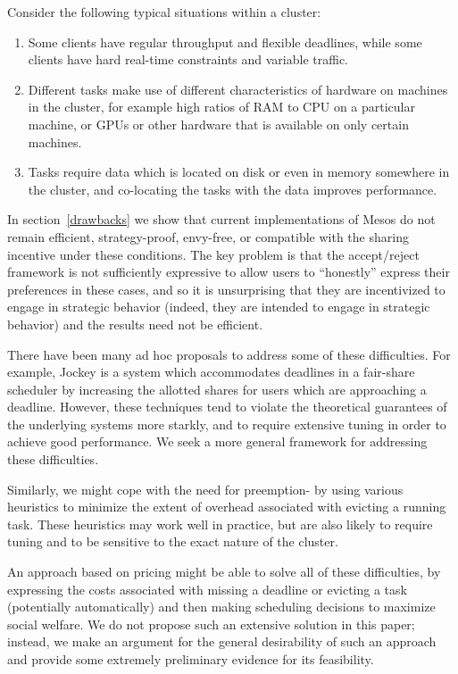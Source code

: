 \documentclass{acm_proc_article-sp}
\begin{document}
Consider the following typical situations within a cluster:
\vspace{-5mm}
\begin{enumerate}
\itemsep0em
  \item Some clients have regular throughput and flexible deadlines, while some
    clients have hard real-time constraints and variable traffic.
  \item Different tasks make use of different characteristics of hardware on
    machines in the cluster, for example high ratios of RAM to CPU on a
    particular machine, or GPUs or other hardware that is available on only
    certain machines.
  \item Tasks require data which is located on disk or even in memory somewhere
    in the cluster, and co-locating the tasks with the data improves
    performance.
\end{enumerate}
\vspace{-5mm}
In section~\ref{drawbacks} we show that current implementations
of Mesos do not remain efficient, strategy-proof, envy-free,
or compatible with the sharing incentive under these conditions.
The key problem is that the accept/reject framework is not sufficiently expressive
to allow users to ``honestly'' express their preferences in these cases,
and so it is unsurprising that they are incentivized to engage
in strategic behavior (indeed, they are intended to engage in strategic behavior)
and the results need not be efficient.

There have been many ad hoc proposals to address some of these difficulties.
For example, Jockey is a system which accommodates deadlines in a fair-share
scheduler by increasing the allotted shares for users which are approaching
a deadline.
However, these techniques tend to violate the theoretical guarantees
of the underlying systems more starkly, and to require extensive tuning
in order to achieve good performance.
We seek a more general framework for addressing these difficulties.

Similarly, we might cope with the need for preemption-  by using various
heuristics to minimize the extent of overhead associated with evicting a running
task.
These heuristics may work well in practice, but are also likely to require
tuning and to be sensitive to the exact nature of the cluster.

An approach based on pricing might be able to solve all of these difficulties,
by expressing the costs associated with missing a deadline or evicting a task 
(potentially automatically) and then making scheduling decisions to maximize
social welfare.
We do not propose such an extensive solution in this paper; instead,
we make an argument for the general desirability of such an approach and provide
some extremely preliminary evidence for its feasibility.
\end{document}
